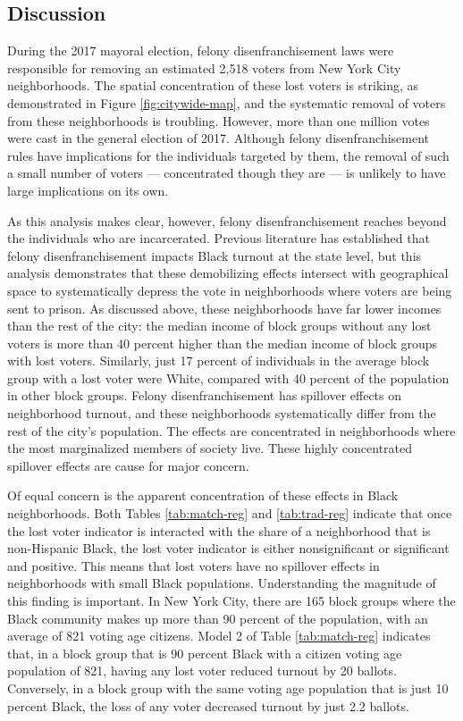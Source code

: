 \documentclass[12pt,]{article}
\begin{document}
\hypertarget{discussion}{%
\subsection*{Discussion}\label{discussion}}

During the 2017 mayoral election, felony disenfranchisement laws were responsible for removing an estimated 2,518 voters from New York City neighborhoods. The spatial concentration of these lost voters is striking, as demonstrated in Figure \ref{fig:citywide-map}, and the systematic removal of voters from these neighborhoods is troubling. However, more than one million votes were cast in the general election of 2017. Although felony disenfranchisement rules have implications for the individuals targeted by them, the removal of such a small number of voters --- concentrated though they are --- is unlikely to have large implications on its own.

As this analysis makes clear, however, felony disenfranchisement reaches beyond the individuals who are incarcerated. Previous literature has established that felony disenfranchisement impacts Black turnout at the state level, but this analysis demonstrates that these demobilizing effects intersect with geographical space to systematically depress the vote in neighborhoods where voters are being sent to prison. As discussed above, these neighborhoods have far lower incomes than the rest of the city: the median income of block groups without any lost voters is more than 40 percent higher than the median income of block groups with lost voters. Similarly, just 17 percent of individuals in the average block group with a lost voter were White, compared with 40 percent of the population in other block groups. Felony disenfranchisement has spillover effects on neighborhood turnout, and these neighborhoods systematically differ from the rest of the city's population. The effects are concentrated in neighborhoods where the most marginalized members of society live. These highly concentrated spillover effects are cause for major concern.

Of equal concern is the apparent concentration of these effects in Black neighborhoods. Both Tables \ref{tab:match-reg} and \ref{tab:trad-reg} indicate that once the lost voter indicator is interacted with the share of a neighborhood that is non-Hispanic Black, the lost voter indicator is either nonsignificant or significant and positive. This means that lost voters have no spillover effects in neighborhoods with small Black populations. Understanding the magnitude of this finding is important. In New York City, there are 165 block groups where the Black community makes up more than 90 percent of the population, with an average of 821 voting age citizens. Model 2 of Table \ref{tab:match-reg} indicates that, in a block group that is 90 percent Black with a citizen voting age population of 821, having any lost voter reduced turnout by 20 ballots. Conversely, in a block group with the same voting age population that is just 10 percent Black, the loss of any voter decreased turnout by just 2.2 ballots.
\end{document}
